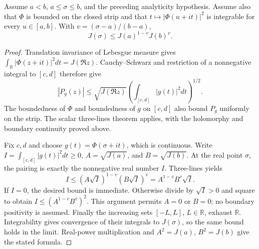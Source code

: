 \begin{theorem}
\label{density:l2-interpolation}
\leanok
Assume $a<b$, $a\leq\sigma\leq b$, and the preceding analyticity
hypothesis.  Assume also that $\Phi$ is bounded on the closed strip
and that $t\mapsto|\Phi(u+it)|^2$ is integrable for every
$u\in[a,b]$.  With $v=(\sigma-a)/(b-a)$,
\[
 J(\sigma)\leq J(a)^{1-v}J(b)^v.
\]
\end{theorem}
\begin{proof}
Translation invariance of Lebesgue measure gives
$\int_{\mathbb R}|\Phi(z+it)|^2dt=J(\Re z)$.
Cauchy--Schwarz and restriction of a nonnegative integral to $[c,d]$
therefore give
\[
 |P_g(z)|\leq \sqrt{J(\Re z)}
       \left(\int_{[c,d]}|g(t)|^2dt\right)^{1/2}.
\]
The boundedness of $\Phi$ and boundedness of $g$ on $[c,d]$ also
bound $P_g$ uniformly on the strip.  The scalar three-lines theorem
applies, with the holomorphy and boundary continuity proved above.

Fix $c,d$ and choose $g(t)=\Phi(\sigma+it)$, which is continuous.
Write $I=\int_{[c,d]}|g(t)|^2dt\geq0$, $A=\sqrt{J(a)}$, and
$B=\sqrt{J(b)}$.  At the real point $\sigma$, the pairing is exactly
the nonnegative real number $I$.  Three-lines yields
\[
 I\leq(A\sqrt I)^{1-v}(B\sqrt I)^v
   =A^{1-v}B^v\sqrt I.
\]
If $I=0$, the desired bound is immediate.  Otherwise divide by
$\sqrt I>0$ and square to obtain
$I\leq(A^{1-v}B^v)^2$.
This argument permits $A=0$ or $B=0$; no boundary positivity is
assumed.  Finally the increasing sets $[-L,L]$, $L\in\mathbb R$,
exhaust $\mathbb R$.  Integrability gives convergence of their
integrals to $J(\sigma)$, so the same bound holds in the limit.
Real-power multiplication and $A^2=J(a)$, $B^2=J(b)$ give the stated
formula.
\end{proof}

